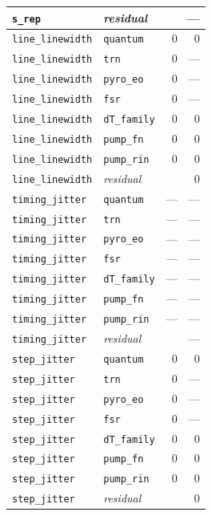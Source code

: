 \begin{table}[t]
\begin{tabular}{llrr}
    \texttt{s\_rep} & \emph{residual} & \multicolumn{2}{r}{---} \\
    \midrule
    \texttt{line\_linewidth} & \texttt{quantum} & $0$ & $0$ \\
    \texttt{line\_linewidth} & \texttt{trn} & $0$ & --- \\
    \texttt{line\_linewidth} & \texttt{pyro\_eo} & $0$ & --- \\
    \texttt{line\_linewidth} & \texttt{fsr} & $0$ & --- \\
    \texttt{line\_linewidth} & \texttt{dT\_family} & $0$ & $0$ \\
    \texttt{line\_linewidth} & \texttt{pump\_fn} & $0$ & $0$ \\
    \texttt{line\_linewidth} & \texttt{pump\_rin} & $0$ & $0$ \\
    \texttt{line\_linewidth} & \emph{residual} & \multicolumn{2}{r}{$0$} \\
    \midrule
    \texttt{timing\_jitter} & \texttt{quantum} & --- & --- \\
    \texttt{timing\_jitter} & \texttt{trn} & --- & --- \\
    \texttt{timing\_jitter} & \texttt{pyro\_eo} & --- & --- \\
    \texttt{timing\_jitter} & \texttt{fsr} & --- & --- \\
    \texttt{timing\_jitter} & \texttt{dT\_family} & --- & --- \\
    \texttt{timing\_jitter} & \texttt{pump\_fn} & --- & --- \\
    \texttt{timing\_jitter} & \texttt{pump\_rin} & --- & --- \\
    \texttt{timing\_jitter} & \emph{residual} & \multicolumn{2}{r}{---} \\
    \midrule
    \texttt{step\_jitter} & \texttt{quantum} & $0$ & $0$ \\
    \texttt{step\_jitter} & \texttt{trn} & $0$ & --- \\
    \texttt{step\_jitter} & \texttt{pyro\_eo} & $0$ & --- \\
    \texttt{step\_jitter} & \texttt{fsr} & $0$ & --- \\
    \texttt{step\_jitter} & \texttt{dT\_family} & $0$ & $0$ \\
    \texttt{step\_jitter} & \texttt{pump\_fn} & $0$ & $0$ \\
    \texttt{step\_jitter} & \texttt{pump\_rin} & $0$ & $0$ \\
    \texttt{step\_jitter} & \emph{residual} & \multicolumn{2}{r}{$0$} \\
    \bottomrule
  \end{tabular}
\end{table}
